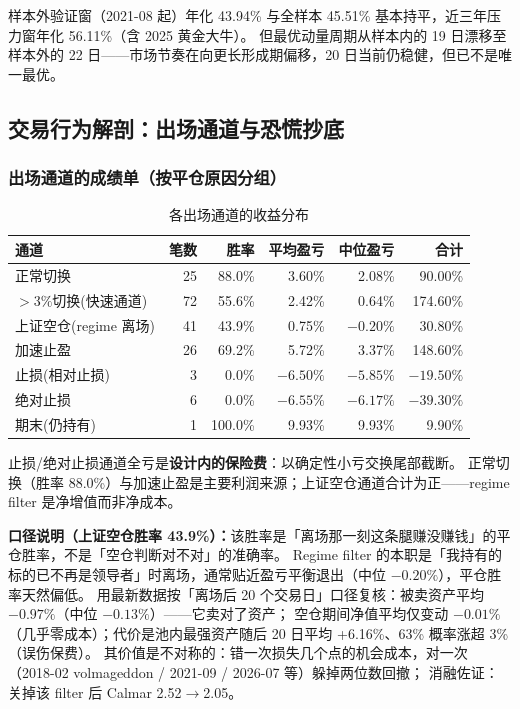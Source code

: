 \documentclass[11pt]{ctexart}
\begin{document}
样本外验证窗（2021-08 起）年化 43.94\% 与全样本 45.51\% 基本持平，近三年压力窗年化 56.11\%（含 2025 黄金大牛）。
但最优动量周期从样本内的 19 日漂移至样本外的 22 日——市场节奏在向更长形成期偏移，20 日当前仍稳健，但已不是唯一最优。

\subsection{交易行为解剖：出场通道与恐慌抄底}

\subsubsection{出场通道的成绩单（按平仓原因分组）}

\begin{table}[htbp]
\centering
\caption{各出场通道的收益分布}
\begin{tabularx}{\textwidth}{Xrrrrr}
\toprule
通道 & 笔数 & 胜率 & 平均盈亏 & 中位盈亏 & 合计 \\
\midrule
正常切换 & 25 & 88.0\% & 3.60\% & 2.08\% & 90.00\% \\
$>3\%$切换(快速通道) & 72 & 55.6\% & 2.42\% & 0.64\% & 174.60\% \\
上证空仓(regime 离场) & 41 & 43.9\% & 0.75\% & $-0.20\%$ & 30.80\% \\
加速止盈 & 26 & 69.2\% & 5.72\% & 3.37\% & 148.60\% \\
止损(相对止损) & 3 & 0.0\% & $-6.50\%$ & $-5.85\%$ & $-19.50\%$ \\
绝对止损 & 6 & 0.0\% & $-6.55\%$ & $-6.17\%$ & $-39.30\%$ \\
期末(仍持有) & 1 & 100.0\% & 9.93\% & 9.93\% & 9.90\% \\
\bottomrule
\end{tabularx}
\end{table}

止损/绝对止损通道全亏是\textbf{设计内的保险费}：以确定性小亏交换尾部截断。
正常切换（胜率 88.0\%）与加速止盈是主要利润来源；上证空仓通道合计为正——regime filter 是净增值而非净成本。

\textbf{口径说明（上证空仓胜率 43.9\%）：}该胜率是「离场那一刻这条腿赚没赚钱」的平仓胜率，不是「空仓判断对不对」的准确率。
Regime filter 的本职是「我持有的标的已不再是领导者」时离场，通常贴近盈亏平衡退出（中位 $-0.20\%$），平仓胜率天然偏低。
用最新数据按「离场后 20 个交易日」口径复核：被卖资产平均 $-0.97\%$（中位 $-0.13\%$）——它卖对了资产；
空仓期间净值平均仅变动 $-0.01\%$（几乎零成本）；代价是池内最强资产随后 20 日平均 +6.16\%、63\% 概率涨超 3\%（误伤保费）。
其价值是不对称的：错一次损失几个点的机会成本，对一次（2018-02 volmageddon / 2021-09 / 2026-07 等）躲掉两位数回撤；
消融佐证：关掉该 filter 后 Calmar 2.52$\rightarrow$2.05。
\end{document}
